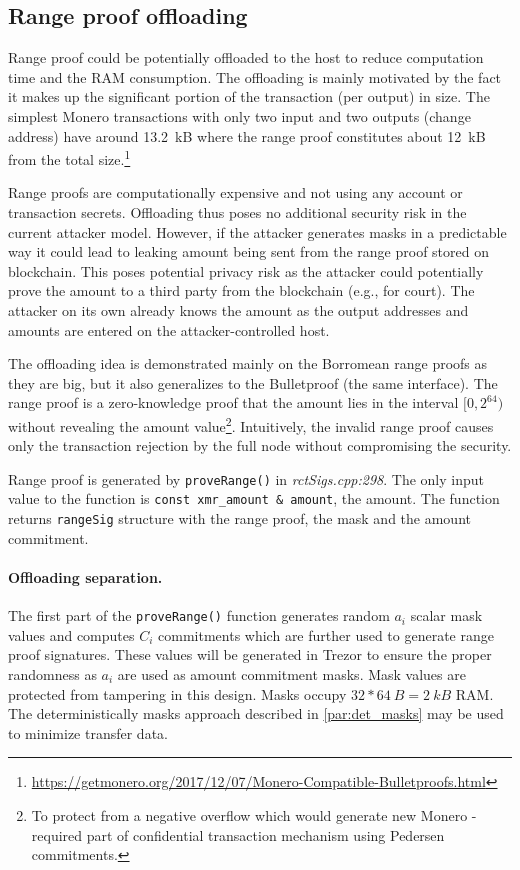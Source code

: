 \documentclass[]{article}
\begin{document}
\subsection{Range proof offloading}
Range proof could be potentially offloaded to the host to reduce computation time and the RAM consumption.
The offloading is mainly motivated by the fact it makes up the significant portion of the transaction (per output) in size. The simplest Monero transactions with only two input and two outputs (change address) have around 
13.2~kB where the range proof constitutes about 12~kB from the total size.\footnote{\url{https://getmonero.org/2017/12/07/Monero-Compatible-Bulletproofs.html}}
 
Range proofs are computationally expensive and not using any account or transaction secrets. Offloading thus poses no additional security risk in the current attacker model. However, if the attacker generates masks in a predictable way it could lead to leaking amount being sent from the range proof stored on blockchain. This poses potential privacy risk as the attacker could potentially prove the amount to a third party from the blockchain (e.g., for court). The attacker on its own already knows the amount as the output addresses and amounts are entered on the attacker-controlled host.
  
The offloading idea is demonstrated mainly on the Borromean range proofs as they are big, but it also generalizes to the Bulletproof (the same interface). 
The range proof is a zero-knowledge proof that the amount lies in the interval $[0, 2^{64})$ without revealing the amount value\footnote{To protect from a negative overflow which would generate new Monero - required part of confidential transaction mechanism using Pedersen commitments.}. Intuitively, the invalid range proof causes only the transaction rejection by the full node without compromising the security.

Range proof is generated by \verb|proveRange()| in \emph{rctSigs.cpp:298}. The only input value to the function is \verb|const xmr_amount & amount|, the amount. The function returns \verb|rangeSig| structure with the range proof, the mask and the amount commitment. 

\paragraph{Offloading separation.}
The first part of the \verb|proveRange()| function generates random $a_i$ scalar mask values and computes $C_i$ commitments which are further used to generate range proof signatures. These values will be generated in Trezor to ensure the proper randomness as $a_i$ are used as amount commitment masks. Mask values are protected from tampering in this design. Masks occupy $32*64~B = 2~kB$ RAM. 
The deterministically masks approach described in \ref{par:det_masks} may be used to minimize transfer data.
\end{document}
